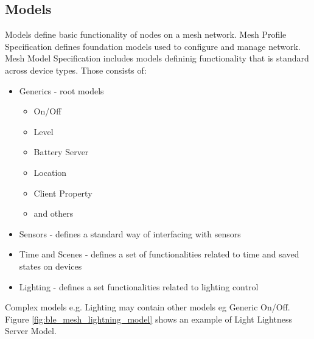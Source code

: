 \documentclass[\main/main.tex]{subfiles}
\begin{document}
\subsection{Models}
Models define basic functionality of nodes on a mesh network. Mesh Profile Specification defines foundation models used to configure and manage network. Mesh Model Specification includes models defininig functionality that is standard across device types. Those consists of:
\begin{itemize}
    \item Generics - root models \begin{itemize}
        \item On/Off
        \item Level
        \item Battery Server
        \item Location
        \item Client Property
        \item and others
    \end{itemize}
    \item Sensors - defines a standard way of interfacing with sensors
    \item Time and Scenes - defines a set of functionalities related to time and saved states on devices
    \item Lighting - defines a set functionalities related to lighting control
\end{itemize}
Complex models e.g. Lighting may contain other models eg Generic On/Off. Figure \ref{fig:ble_mesh_lightning_model} shows an example of Light Lightness Server Model.
\end{document}
